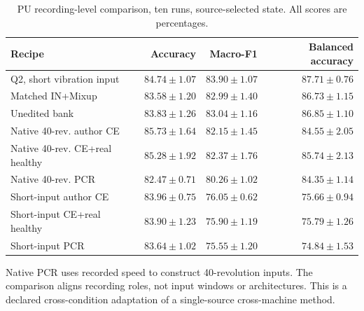 \begin{table}[pos=htbp]
\centering\footnotesize
\caption{PU recording-level comparison, ten runs, source-selected state. All scores are percentages.}
\label{tab:pcr-selected}
\begin{tabular}{lrrr}
\toprule
Recipe & Accuracy & Macro-F1 & Balanced accuracy\\
\midrule
Q2, short vibration input & $84.74\pm1.07$ & $83.90\pm1.07$ & $87.71\pm0.76$\\
Matched IN+Mixup & $83.58\pm1.20$ & $82.99\pm1.40$ & $86.73\pm1.15$\\
Unedited bank & $83.83\pm1.26$ & $83.04\pm1.16$ & $86.85\pm1.10$\\
Native 40-rev. author CE & $85.73\pm1.64$ & $82.15\pm1.45$ & $84.55\pm2.05$\\
Native 40-rev. CE+real healthy & $85.28\pm1.92$ & $82.37\pm1.76$ & $85.74\pm2.13$\\
Native 40-rev. PCR & $82.47\pm0.71$ & $80.26\pm1.02$ & $84.35\pm1.14$\\
Short-input author CE & $83.96\pm0.75$ & $76.05\pm0.62$ & $75.66\pm0.94$\\
Short-input CE+real healthy & $83.90\pm1.23$ & $75.90\pm1.19$ & $75.79\pm1.26$\\
Short-input PCR & $83.64\pm1.02$ & $75.55\pm1.20$ & $74.84\pm1.53$\\
\bottomrule
\end{tabular}
\par\medskip\begin{minipage}{.98\linewidth}\footnotesize Native PCR uses recorded speed to construct 40-revolution inputs. The comparison aligns recording roles, not input windows or architectures. This is a declared cross-condition adaptation of a single-source cross-machine method.\end{minipage}
\end{table}
